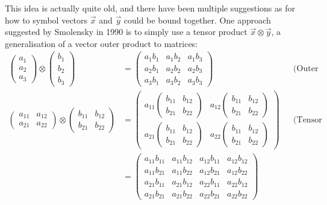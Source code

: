 \documentclass[10pt,letterpaper,oneside]{article}
\begin{document}
This idea is actually quite old, and there have been multiple suggestions as for how to symbol vectors $\vec x$ and $\vec y$ could be bound together. One approach suggested by Smolensky in 1990 \cite{smolensky1990tensor} is to simply use a tensor product $\vec x \otimes \vec y$, a generalisation of a vector outer product to matrices:
\begin{align*}
	\begin{pmatrix}a_1\\a_2\\a_3\end{pmatrix} \otimes \begin{pmatrix}b_1\\b_2\\b_3\end{pmatrix} &=
	\begin{pmatrix}
		a_1 b_1 & a_1 b_2 & a_1 b_3 \\
		a_2 b_1 & a_2 b_2 & a_2 b_3 \\
		a_3 b_1 & a_3 b_2 & a_3 b_3
	\end{pmatrix} && \text{(Outer product)} \\
	\begin{pmatrix}a_{11} & a_{12} \\ a_{21} & a_{22} \end{pmatrix} \otimes
	\begin{pmatrix}b_{11} & b_{12} \\ b_{21} & b_{22} \end{pmatrix} &=
	\begin{pmatrix}
		a_{11} \begin{pmatrix}b_{11} & b_{12} \\ b_{21} & b_{22} \end{pmatrix} &
		a_{12} \begin{pmatrix}b_{11} & b_{12} \\ b_{21} & b_{22} \end{pmatrix} \\
		a_{21} \begin{pmatrix}b_{11} & b_{12} \\ b_{21} & b_{22} \end{pmatrix} &
		a_{22} \begin{pmatrix}b_{11} & b_{12} \\ b_{21} & b_{22} \end{pmatrix}
	\end{pmatrix} && \text{(Tensor product)}\\ &= 
	\begin{pmatrix}
		a_{11} b_{11} & a_{11} b_{12} & a_{12} b_{11} & a_{12} b_{12} \\
		a_{11} b_{21} & a_{11} b_{22} & a_{12} b_{21} & a_{12} b_{22} \\
		a_{21} b_{11} & a_{21} b_{12} & a_{22} b_{11} & a_{22} b_{12} \\
		a_{21} b_{21} & a_{21} b_{22} & a_{22} b_{21} & a_{22} b_{22}
	\end{pmatrix}
\end{align*}
\end{document}

